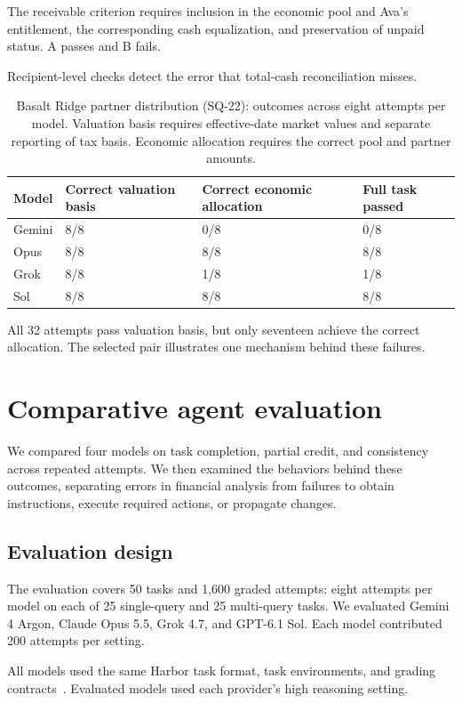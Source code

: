 \documentclass[11pt,letterpaper]{article}
\begin{document}
The receivable criterion requires inclusion in the economic pool and Ava's entitlement, the corresponding cash equalization, and preservation of unpaid status. A passes and B fails.

Recipient-level checks detect the error that total-cash reconciliation misses.

\begin{table}[H]\centering\small
\caption{Basalt Ridge partner distribution (SQ-22): outcomes across eight attempts per model. Valuation basis requires effective-date market values and separate reporting of tax basis. Economic allocation requires the correct pool and partner amounts.}\label{tab:basalt-comparison}
\begin{tabularx}{\linewidth}{@{}lYYY@{}}\toprule
Model & Correct valuation basis & Correct economic allocation & Full task passed\\\midrule
Gemini & 8/8 & 0/8 & 0/8\\
Opus & 8/8 & 8/8 & 8/8\\
Grok & 8/8 & 1/8 & 1/8\\
Sol & 8/8 & 8/8 & 8/8\\\bottomrule
\end{tabularx}
\end{table}

All 32 attempts pass valuation basis, but only seventeen achieve the correct allocation. The selected pair illustrates one mechanism behind these failures.

\section{Comparative agent evaluation}\label{sec:results}
We compared four models on task completion, partial credit, and consistency across repeated attempts. We then examined the behaviors behind these outcomes, separating errors in financial analysis from failures to obtain instructions, execute required actions, or propagate changes.

\subsection{Evaluation design}
The evaluation covers 50 tasks and 1,600 graded attempts: eight attempts per model on each of 25 single-query and 25 multi-query tasks. We evaluated Gemini 4 Argon, Claude Opus 5.5, Grok 4.7, and GPT-6.1 Sol. Each model contributed 200 attempts per setting.

All models used the same Harbor task format, task environments, and grading contracts~\cite{harbor}. Evaluated models used each provider's high reasoning setting.
\end{document}
